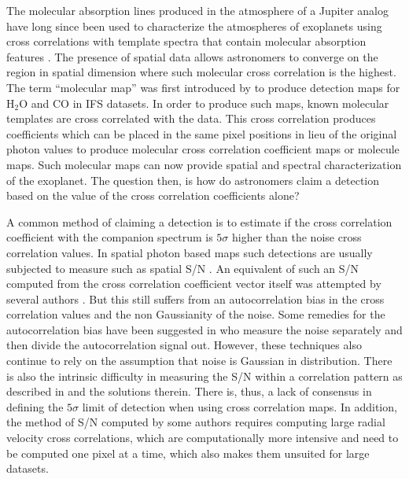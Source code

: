 \documentclass{aa}
\begin{document}
The molecular absorption lines produced in the atmosphere of a Jupiter analog have long since been used to characterize the atmospheres of exoplanets using cross correlations with template spectra \cite[e.g][]{birkby2013detection,snellen2010orbital} that contain molecular absorption features \citep[e.g][]{2003BTsettl}.
The presence of spatial data allows astronomers to converge on the region in spatial dimension where such molecular cross correlation is the highest.
The term ``molecular map'' was first introduced by \citet{2018AHoeijmakersMM} to produce detection maps for \rm{H$_2$O} and \rm{CO} in IFS datasets.
In order to produce such maps, known molecular templates are cross correlated with the data.
This cross correlation produces coefficients which can be placed in the same pixel positions in lieu of the original photon values to produce molecular cross correlation coefficient maps or molecule maps.
Such molecular maps can now provide spatial and spectral characterization of the exoplanet.
The question then, is how do astronomers claim a detection based on the value of the cross correlation coefficients alone?

A common method of claiming a detection is to estimate if the cross correlation coefficient with the companion spectrum is $5\sigma$ higher than the noise cross correlation values.
In spatial photon based maps such detections are usually subjected to measure such as spatial S/N \citep[][]{2014MawetSNR}.
An equivalent of such an S/N computed from the cross correlation coefficient vector itself was attempted by several authors \citep[e.g., ][]{2018AHoeijmakersMM, 2021Cugno,2022Patapis}.
But this still suffers from an autocorrelation bias in the cross correlation values and the non Gaussianity of the noise.
Some remedies for the autocorrelation bias have been suggested in \citet[][]{ruffio2019radial} who measure the noise separately and then divide the autocorrelation signal out.
However, these techniques also continue to rely on the assumption that noise is Gaussian in distribution.
There is also the intrinsic difficulty in measuring the S/N within a correlation pattern as described in \cite{2023Malin} and the solutions therein. There is, thus, a lack of consensus in defining the $5\sigma$ limit of detection when using cross correlation maps.
In addition, the method of S/N computed by some authors \citep[e.g in][]{2021Cugno} requires computing large radial velocity cross correlations, which are computationally more intensive and need to be computed one pixel at a time, which also makes them unsuited for large datasets.
\end{document}
